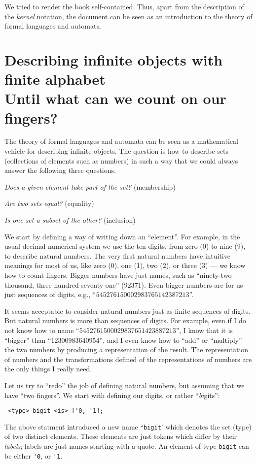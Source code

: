 \documentclass{book}
\newcommand{\kernel}{{\it kernel}}
\begin{document}
We tried to render the book self-contained. Thus, apart from the
description of the \kernel{} notation, the document can be seen as an
introduction to the theory of formal languages and automata.

\chapter{Describing infinite objects with
  finite alphabet\\[1cm]
  \hfill \large 
  Until what can we count on our fingers?}

The theory of formal languages and automata can be seen as a
mathematical vehicle for describing infinite objects. The question is
how to describe sets (collections of elements such as numbers) in such
a way that we could always answer the following three questions.
\begin{description}
\item \emph{Does a given element take part of the set?} (membership)
\item \emph{Are two sets equal?} (equality)
\item \emph{Is one set a subset of the other?} (inclusion)
\end{description}

We start by defining a way of writing down an ``element''. For
example, in the usual decimal numerical system we use the ten digits,
from zero (0) to nine (9), to describe natural numbers. The very first
natural numbers have intuitive meanings for most of us, like zero (0),
one (1), two (2), or three (3) --- we know how to count
fingers. Bigger numbers have just names, such as ``ninety-two
thousand, three hundred seventy-one'' (92371). Even bigger numbers are
for us just sequences of digits, e.g.,
``$545276150002983765142387213$''.

It seems acceptable to consider natural numbers just as finite
sequences of digits. But natural numbers is more than sequences of
digits. For example, even if I do not know how to name
``$5452761500029837651423887213$'', I know that it is ``bigger'' than
``$12300983640954$'', and I even know how to ``add'' or ``multiply'' the two
numbers by producing a representation of the result.  The
representation of numbers and the transformations defined of the
representations of numbers are the only things I really need.

Let us try to ``redo'' the job of defining natural numbers, but
assuming that we have ``two fingers''. 
We start with defining our digits, or rather ``\emph{bi}gits'':
\begin{verbatim}
 <type> bigit <is> ['0, '1];
\end{verbatim}
The above statment intruduced a new name ``\verb+bigit+' which
denotes the set (type) of two distinct elements. These
elements are just tokens which differ by their \emph{labels}; labels
are just names starting with a quote. An element of type
\verb+bigit+ can be either \verb+'0+, or \verb+'1+.
\end{document}
